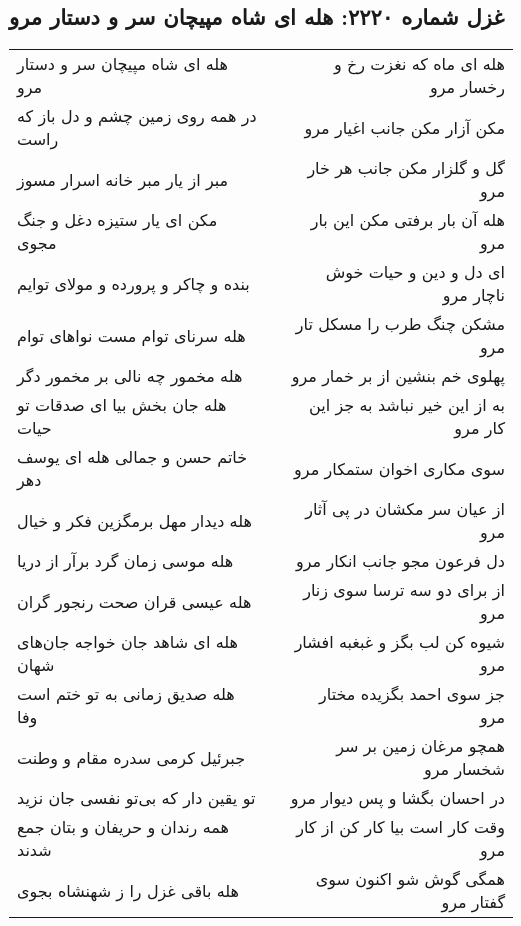 \begin{center}
\section*{غزل شماره ۲۲۲۰: هله ای شاه مپیچان سر و دستار مرو}
\label{sec:2220}
\begin{longtable}{l p{0.5cm} r}
هله ای شاه مپیچان سر و دستار مرو
&&
هله ای ماه که نغزت رخ و رخسار مرو
\\
در همه روی زمین چشم و دل باز که راست
&&
مکن آزار مکن جانب اغیار مرو
\\
مبر از یار مبر خانه اسرار مسوز
&&
گل و گلزار مکن جانب هر خار مرو
\\
مکن ای یار ستیزه دغل و جنگ مجوی
&&
هله آن بار برفتی مکن این بار مرو
\\
بنده و چاکر و پرورده و مولای توایم
&&
ای دل و دین و حیات خوش ناچار مرو
\\
هله سرنای توام مست نواهای توام
&&
مشکن چنگ طرب را مسکل تار مرو
\\
هله مخمور چه نالی بر مخمور دگر
&&
پهلوی خم بنشین از بر خمار مرو
\\
هله جان بخش بیا ای صدقات تو حیات
&&
به از این خیر نباشد به جز این کار مرو
\\
خاتم حسن و جمالی هله ای یوسف دهر
&&
سوی مکاری اخوان ستمکار مرو
\\
هله دیدار مهل برمگزین فکر و خیال
&&
از عیان سر مکشان در پی آثار مرو
\\
هله موسی زمان گرد برآر از دریا
&&
دل فرعون مجو جانب انکار مرو
\\
هله عیسی قران صحت رنجور گران
&&
از برای دو سه ترسا سوی زنار مرو
\\
هله ای شاهد جان خواجه جان‌های شهان
&&
شیوه کن لب بگز و غبغبه افشار مرو
\\
هله صدیق زمانی به تو ختم است وفا
&&
جز سوی احمد بگزیده مختار مرو
\\
جبرئیل کرمی سدره مقام و وطنت
&&
همچو مرغان زمین بر سر شخسار مرو
\\
تو یقین دار که بی‌تو نفسی جان نزید
&&
در احسان بگشا و پس دیوار مرو
\\
همه رندان و حریفان و بتان جمع شدند
&&
وقت کار است بیا کار کن از کار مرو
\\
هله باقی غزل را ز شهنشاه بجوی
&&
همگی گوش شو اکنون سوی گفتار مرو
\\
\end{longtable}
\end{center}
